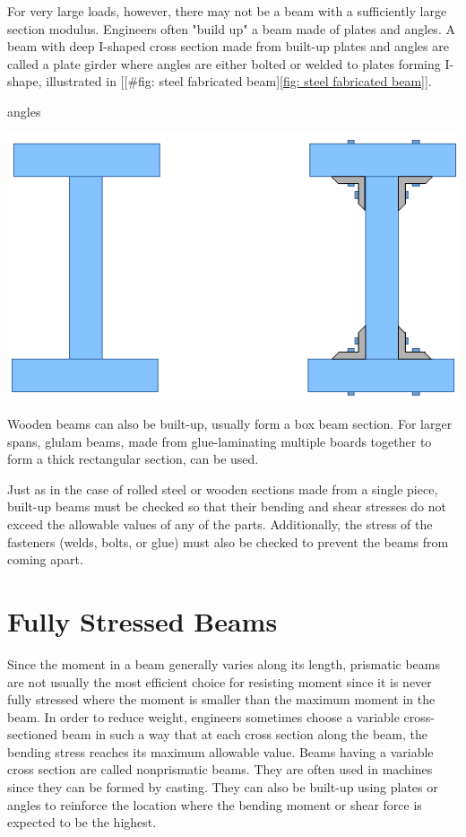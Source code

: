 \documentclass[a4paper,openany,12pt]{book}
\begin{document}
{{For very large loads, however, there may not be a beam with a
sufficiently large section modulus. Engineers often "build up" a beam
made of plates and angles. A beam with deep I-shaped cross section made
from built-up plates and angles are called a plate girder where angles
are either bolted or welded to plates forming I-shape, illustrated in
[[\#fig: steel fabricated beam]\ref{fig: steel fabricated beam}].


angles
\begin{center}
\includegraphics[width=.9\linewidth]{pictures/Simple-load-bearing/steel-fab-beams.pdf}
\label{fig: steel fabricated beam}
\end{center}

Wooden beams can also be built-up, usually form a box beam section. For
larger spans, glulam beams, made from glue-laminating multiple boards
together to form a thick rectangular section, can be used.

Just as in the case of rolled steel or wooden sections made from a
single piece, built-up beams must be checked so that their bending and
shear stresses do not exceed the allowable values of any of the parts.
Additionally, the stress of the fasteners (welds, bolts, or glue) must
also be checked to prevent the beams from coming apart.

\section{Fully Stressed Beams}
\label{fully-stressed-beams}
Since the moment in a beam generally varies along its length, prismatic
beams are not usually the most efficient choice for resisting moment
since it is never fully stressed where the moment is smaller than the
maximum moment in the beam. In order to reduce weight, engineers
sometimes choose a variable cross-sectioned beam in such a way that at
each cross section along the beam, the bending stress reaches its
maximum allowable value. Beams having a variable cross section are
called nonprismatic beams. They are often used in machines since they
can be formed by casting. They can also be built-up using plates or
angles to reinforce the location where the bending moment or shear force
is expected to be the highest.

}}
\end{document}
